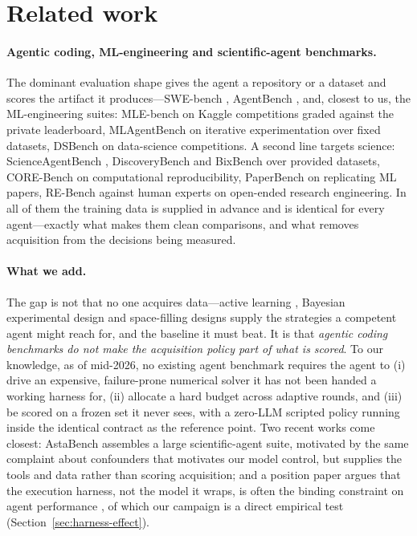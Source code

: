 \section{Related work}
\label{sec:related}

\paragraph{Agentic coding, ML-engineering and scientific-agent benchmarks.}
The dominant evaluation shape gives the agent a repository or a dataset and
scores the artifact it produces---SWE-bench \citep{jimenez2024swebench},
AgentBench \citep{liu2024agentbench}, and, closest to us, the ML-engineering
suites: MLE-bench \citep{chan2024mlebench} on Kaggle competitions graded against
the private leaderboard, MLAgentBench \citep{huang2024mlagentbench} on iterative
experimentation over fixed datasets, DSBench \citep{jing2024dsbench} on
data-science competitions. A second line targets science: ScienceAgentBench
\citep{chen2025scienceagentbench}, DiscoveryBench
\citep{majumder2025discoverybench} and BixBench \citep{mitchener2025bixbench}
over provided datasets, CORE-Bench \citep{siegel2024corebench} on computational
reproducibility, PaperBench \citep{starace2025paperbench} on replicating ML
papers, RE-Bench \citep{wijk2024rebench} against human experts on open-ended
research engineering. In all of them the training data is supplied in advance
and is identical for every agent---exactly what makes them clean comparisons,
and what removes acquisition from the decisions being measured.

\paragraph{What we add.}
The gap is not that no one acquires data---active learning
\citep{settles2009active}, Bayesian experimental design
\citep{chaloner1995bayesian} and space-filling designs \citep{mckay1979lhs}
supply the strategies a competent agent might reach for, and the baseline it
must beat. It is that \emph{agentic coding benchmarks do not make the
acquisition policy part of what is scored}. To our knowledge, as of mid-2026, no
existing agent benchmark requires the agent to (i) drive an expensive,
failure-prone numerical solver it has not been handed a working harness for,
(ii) allocate a hard budget across adaptive rounds, and (iii) be scored on a
frozen set it never sees, with a zero-LLM scripted policy running inside the
identical contract as the reference point. Two recent works come closest:
AstaBench \citep{bragg2025astabench} assembles a large scientific-agent suite,
motivated by the same complaint about confounders that motivates our model
control, but supplies the tools and data rather than scoring acquisition; and a
position paper argues that the execution harness, not the model it wraps, is
often the binding constraint on agent performance \citep{zhang2026harness},
of which our campaign is a direct empirical test
(Section~\ref{sec:harness-effect}).

